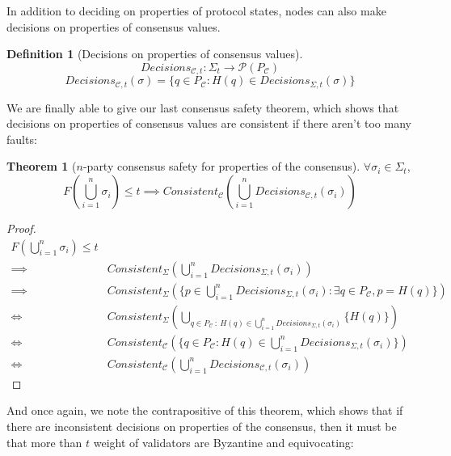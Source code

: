 \documentclass{article}
\theoremstyle{definition}
\newtheorem{thm}{Theorem}
\newtheorem{defn}{Definition}[section]
\begin{document}
In addition to deciding on properties of protocol states, nodes can also make decisions on properties of consensus values.

\begin{defn}[Decisions on properties of consensus values]
$$Decisions_{\mathcal{C},t} : \Sigma_t \to \mathcal{P}(P_{\mathcal{C}})$$
$$Decisions_{\mathcal{C},t}(\sigma) = \{q \in P_{\mathcal{C}}: H(q) \in Decisions_{\Sigma,t}(\sigma)\}$$
\end{defn}

We are finally able to give our last consensus safety theorem, which shows that decisions on properties of consensus values are consistent if there aren't too many faults:

\begin{thm}[$n$-party consensus safety for properties of the consensus]
$\forall \sigma_i \in \Sigma_t$,
$$F(\bigcup_{i=1}^n \sigma_i) \leq t \implies Consistent_{\mathcal{C}}(\bigcup_{i=1}^n Decisions_{\mathcal{C},t}(\sigma_i))$$
\end{thm}


\begin{proof}
\begin{align}
F(\bigcup_{i=1}^n \sigma_i) \leq t\\
\implies&   Consistent_\Sigma(\bigcup_{i=1}^n Decisions_{\Sigma,t}(\sigma_i)) \\
\implies&   Consistent_\Sigma(\{ p \in \bigcup_{i=1}^n  Decisions_{\Sigma,t}(\sigma_i): \exists q \in P_{\mathcal{C}}, p = H(q)\})\\
\iff&   Consistent_\Sigma(\bigcup_{q \in P_{\mathcal{C}} ~:~ H(q) \in \bigcup_{i=1}^n Decisions_{\Sigma,t}(\sigma_i)} \{H(q)\} )\\
\iff& Consistent_{\mathcal{C}}(\{q \in P_{\mathcal{C}}: H(q) \in \bigcup_{i=1}^n Decisions_{\Sigma,t}(\sigma_i)\}) \\
\iff& Consistent_{\mathcal{C}}(\bigcup_{i=1}^n Decisions_{\mathcal{C},t}(\sigma_i))
\end{align}
\end{proof}

And once again, we note the contrapositive of this theorem, which shows that if there are inconsistent decisions on properties of the consensus, then it must be that more than $t$ weight of validators are Byzantine and equivocating:
\end{document}
